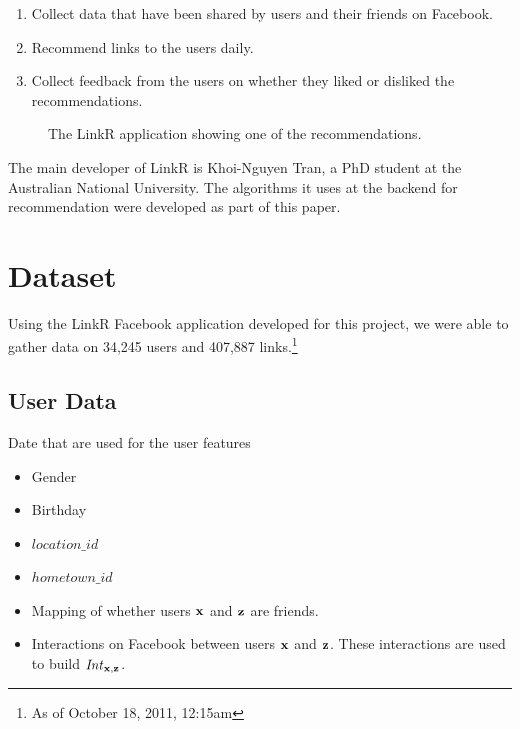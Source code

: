 \begin{enumerate}
\item{Collect data that have been shared by users and their friends on Facebook.}
\item{Recommend links to the users daily.}
\item{Collect feedback from the users on whether they liked or disliked the recommendations.}
\end{enumerate}

\begin{figure}[h]
\centering
\caption{The LinkR application showing one of the recommendations.}
\end{figure}

The main developer of LinkR is Khoi-Nguyen Tran, a PhD student at the Australian National University. The algorithms it uses at the backend for recommendation were developed as part of this paper. 

\section{Dataset}

Using the LinkR Facebook application developed for this project, we were able to gather data on 34,245 users and 407,887 links.\footnote{As of October 18, 2011, 12:15am}

\subsection{User Data}

Date that are used for the user features 
\begin{itemize}
\item {Gender}
\item {Birthday}
\item {$location\_id$}
\item {$hometown\_id$}
\item {Mapping of whether users $\mathbf{x}$ and $\mathbf{z}$ are friends.}
\item {Interactions on Facebook between users $\mathbf{x}$ and $\mathbf{z}$. These interactions are used to build $\mathit{Int}_{\mathbf{x},\mathbf{z}}$. } 
\end{itemize}

